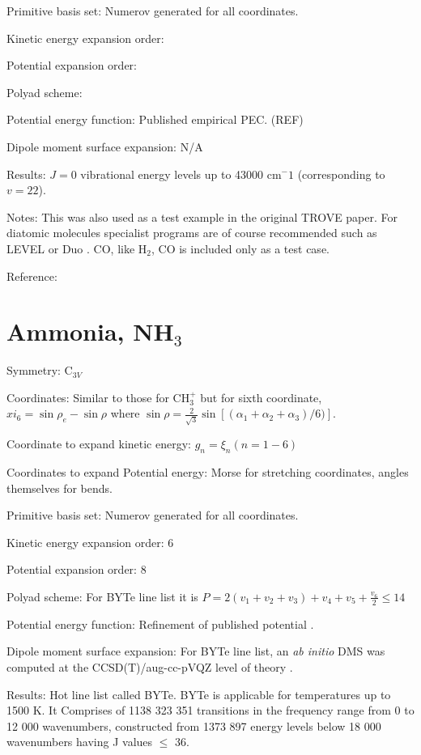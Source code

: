 Primitive basis set: Numerov generated for all coordinates.

Kinetic energy expansion order: 

Potential expansion order: 

Polyad scheme: 

Potential energy function: Published empirical PEC. (REF)

Dipole moment surface expansion: N/A

Results: $J = 0$ vibrational energy levels up to 43000 cm$^-1$ (corresponding to $v = 22$). 

Notes: This was also used as a test example in the original TROVE paper. For diatomic molecules specialist programs
are of course recommended such as LEVEL \cite{Level} or Duo \cite{Duo}. CO, like H$_2$, CO is included only as a test case.

Reference: \cite{TROVE}


\section{Ammonia, NH$_3$}

Symmetry: C$_{3V}$

Coordinates: Similar to those for CH$_3^+$ but for sixth coordinate, $xi_6 = \sin \rho_e - \sin \rho$ where 
$\sin \rho = \frac{2}{\sqrt{3}} \sin\left[ (\alpha_1 + \alpha_2 + \alpha_3)/6) \right]$. 

Coordinate to expand kinetic energy: $g_n = \xi_n (n=1-6)$

Coordinates to expand Potential energy: Morse for stretching coordinates, angles themselves for bends.

Primitive basis set: Numerov generated for all coordinates.

Kinetic energy expansion order: 6

Potential expansion order: 8

Polyad scheme: For BYTe line list it is $P = 2(v_1 + v_2 + v_3) + v_4 + v_5 + \frac{v_6}{2} \leq 14$

Potential energy function: Refinement of published potential \cite{jt466}.

Dipole moment surface expansion: For BYTe line list, an \textit{ab initio} DMS was computed at the CCSD(T)/aug-cc-pVQZ level of
 theory \cite{jt466}.

Results:  Hot line list called BYTe. BYTe is applicable for temperatures up to
1500 K. It Comprises of 1138 323 351 transitions in the frequency range from 0 to 12 000 wavenumbers,
constructed from 1373 897 energy levels below 18 000 wavenumbers having J values $\le$ 36. 

